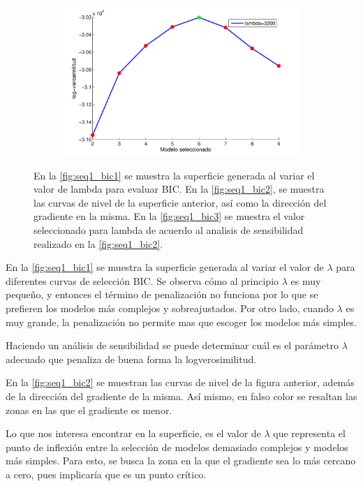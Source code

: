 \begin{figure}[t!]
{\begin{subfigure}[b]{0.6\textwidth}
    \includegraphics[width=\textwidth]{gfx/chap6/cuervobic3} 
    \caption{}
    \label{fig:seq1_bic3}
  \end{subfigure}
  \hspace{0.6\textwidth}
  }
  \caption[Secuencia 1: Pruebas BIC]{En la \autoref{fig:seq1_bic1} se muestra la superficie generada al variar el valor de lambda para evaluar BIC. En la \autoref{fig:seq1_bic2}, se muestra las curvas de nivel de la superficie anterior, así como la dirección del gradiente en la misma. En la \autoref{fig:seq1_bic3} se muestra el valor seleccionado para lambda de acuerdo al analisis de sensibilidad realizado en la \autoref{fig:seq1_bic2}.}
  \label{fig:seq1_bic}
\end{figure}

En la \autoref{fig:seq1_bic1} se muestra la superficie generada al variar el valor de $\lambda$ para diferentes curvas de selección BIC. Se observa cómo al principio $\lambda$ es muy pequeño, y entonces el término de penalización no funciona por lo que se prefieren los modelos más complejos y sobreajustados. Por otro lado, cuando $\lambda$ es muy grande, la penalización no permite mas que escoger los modelos más simples.

Haciendo un análisis de sensibilidad se puede determinar cuál es el parámetro $\lambda$ adecuado que penaliza de buena forma la logverosimilitud.

En la \autoref{fig:seq1_bic2} se muestran las curvas de nivel de la figura anterior, además de la dirección del gradiente de la misma. Así mismo, en falso color se resaltan las zonas en las que el gradiente es menor. 

Lo que nos interesa encontrar en la superficie, es el valor de $\lambda$ que representa el punto de inflexión entre la selección de modelos demasiado complejos y modelos más simples. Para esto, se busca la zona en la que el gradiente sea lo más cercano a cero, pues implicaría que es un punto crítico.


